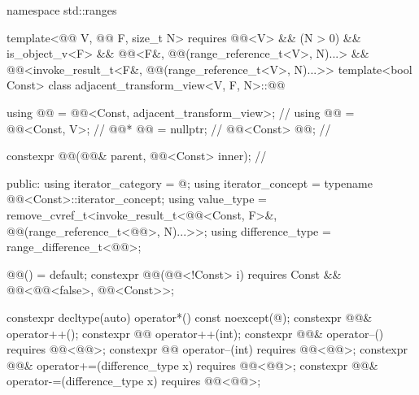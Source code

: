 %
\begin{codeblock}
namespace std::ranges {
  template<@@ V, @@ F, size_t N>
    requires @@<V> && (N > 0) && is_object_v<F> &&
             @@<F&, @@(range_reference_t<V>, N)...> &&
             @@<invoke_result_t<F&, @@(range_reference_t<V>, N)...>>
  template<bool Const>
  class adjacent_transform_view<V, F, N>::@@ {
    using @@ = @@<Const, adjacent_transform_view>;         // \expos
    using @@ = @@<Const, V>;                                 // \expos
    @@* @@ = nullptr;                                          // \expos
    @@<Const> @@;                                       // \expos

    constexpr @@(@@& parent, @@<Const> inner);    // \expos

  public:
    using iterator_category = @\seebelow@;
    using iterator_concept  = typename @@<Const>::iterator_concept;
    using value_type =
      remove_cvref_t<invoke_result_t<@@<Const, F>&,
                                     @@(range_reference_t<@@>, N)...>>;
    using difference_type = range_difference_t<@@>;

    @@() = default;
    constexpr @@(@@<!Const> i)
      requires Const && @@<@@<false>, @@<Const>>;

    constexpr decltype(auto) operator*() const noexcept(@\seebelow@);
    constexpr @@& operator++();
    constexpr @@ operator++(int);
    constexpr @@& operator--() requires @@<@@>;
    constexpr @@ operator--(int) requires @@<@@>;
    constexpr @@& operator+=(difference_type x) requires @@<@@>;
    constexpr @@& operator-=(difference_type x) requires @@<@@>;

}}
\end{codeblock}
